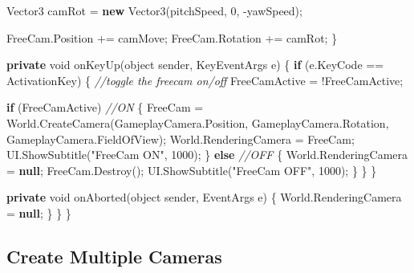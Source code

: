 \documentclass[
  openany]{book}
\newenvironment{Shaded}{\begin{snugshade}}{\end{snugshade}}
\newcommand{\CommentTok}[1]{\textcolor[rgb]{0.56,0.35,0.01}{\textit{#1}}}
\newcommand{\DataTypeTok}[1]{\textcolor[rgb]{0.13,0.29,0.53}{#1}}
\newcommand{\DecValTok}[1]{\textcolor[rgb]{0.00,0.00,0.81}{#1}}
\newcommand{\FunctionTok}[1]{\textcolor[rgb]{0.00,0.00,0.00}{#1}}
\newcommand{\KeywordTok}[1]{\textcolor[rgb]{0.13,0.29,0.53}{\textbf{#1}}}
\newcommand{\NormalTok}[1]{#1}
\newcommand{\StringTok}[1]{\textcolor[rgb]{0.31,0.60,0.02}{#1}}
\begin{document}
\begin{Shaded}
\begin{Highlighting}[]
\NormalTok{            Vector3 camRot = }\KeywordTok{new} \FunctionTok{Vector3}\NormalTok{(pitchSpeed, }\DecValTok{0}\NormalTok{, -yawSpeed);}

\NormalTok{            FreeCam.}\FunctionTok{Position}\NormalTok{ += camMove;}
\NormalTok{            FreeCam.}\FunctionTok{Rotation}\NormalTok{ += camRot;}
\NormalTok{        \}}

        \KeywordTok{private} \DataTypeTok{void} \FunctionTok{onKeyUp}\NormalTok{(}\DataTypeTok{object}\NormalTok{ sender, KeyEventArgs e)}
\NormalTok{        \{}
            \KeywordTok{if}\NormalTok{ (e.}\FunctionTok{KeyCode}\NormalTok{ == ActivationKey)}
\NormalTok{            \{}
                \CommentTok{//toggle the freecam on/off}
\NormalTok{                FreeCamActive = !FreeCamActive;}

                \KeywordTok{if}\NormalTok{ (FreeCamActive) }\CommentTok{//ON}
\NormalTok{                \{}
\NormalTok{                    FreeCam = World.}\FunctionTok{CreateCamera}\NormalTok{(GameplayCamera.}\FunctionTok{Position}\NormalTok{, GameplayCamera.}\FunctionTok{Rotation}\NormalTok{, GameplayCamera.}\FunctionTok{FieldOfView}\NormalTok{);}
\NormalTok{                    World.}\FunctionTok{RenderingCamera}\NormalTok{ = FreeCam;}
\NormalTok{                    UI.}\FunctionTok{ShowSubtitle}\NormalTok{(}\StringTok{"FreeCam ON"}\NormalTok{, }\DecValTok{1000}\NormalTok{);}
\NormalTok{                \}}
                \KeywordTok{else} \CommentTok{//OFF}
\NormalTok{                \{}
\NormalTok{                    World.}\FunctionTok{RenderingCamera}\NormalTok{ = }\KeywordTok{null}\NormalTok{;}
\NormalTok{                    FreeCam.}\FunctionTok{Destroy}\NormalTok{();}
\NormalTok{                    UI.}\FunctionTok{ShowSubtitle}\NormalTok{(}\StringTok{"FreeCam OFF"}\NormalTok{, }\DecValTok{1000}\NormalTok{);}
\NormalTok{                \}}
\NormalTok{            \}}
\NormalTok{        \}}

        \KeywordTok{private} \DataTypeTok{void} \FunctionTok{onAborted}\NormalTok{(}\DataTypeTok{object}\NormalTok{ sender, EventArgs e)}
\NormalTok{        \{}
\NormalTok{            World.}\FunctionTok{RenderingCamera}\NormalTok{ = }\KeywordTok{null}\NormalTok{;}
\NormalTok{        \}}
\NormalTok{    \}}
\NormalTok{\}}
    
\end{Highlighting}
\end{Shaded}

\hypertarget{create-multiple-cameras}{%
\subsection*{Create Multiple Cameras}\label{create-multiple-cameras}}
\end{document}
